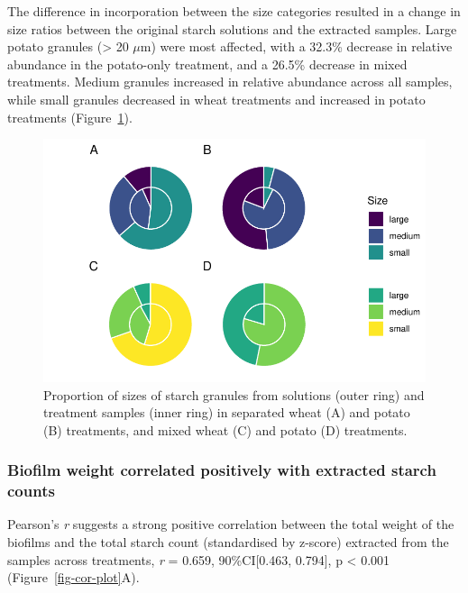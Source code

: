 \documentclass[
  b5paper,
]{book}
\begin{document}
The difference in incorporation between the size categories resulted in
a change in size ratios between the original starch solutions and the
extracted samples. Large potato granules (\textgreater{} 20 \(\mu\)m)
were most affected, with a 32.3\% decrease in relative abundance in the
potato-only treatment, and a 26.5\% decrease in mixed treatments. Medium
granules increased in relative abundance across all samples, while small
granules decreased in wheat treatments and increased in potato
treatments (Figure~\ref{fig-ratio-plots}).

\begin{figure}[H]

{\centering \includegraphics{figures/byoc-starch-fig-ratio-plots-1.pdf}

}

\caption{\label{fig-ratio-plots}Proportion of sizes of starch granules
from solutions (outer ring) and treatment samples (inner ring) in
separated wheat (A) and potato (B) treatments, and mixed wheat (C) and
potato (D) treatments.}

\end{figure}

\hypertarget{biofilm-weight-correlated-positively-with-extracted-starch-counts}{%
\subsubsection{Biofilm weight correlated positively with extracted
starch
counts}\label{biofilm-weight-correlated-positively-with-extracted-starch-counts}}

Pearson's \emph{r} suggests a strong positive correlation between the
total weight of the biofilms and the total starch count (standardised by
z-score) extracted from the samples across treatments, \emph{r} = 0.659,
90\%CI{[}0.463, 0.794{]}, p \textless{} 0.001
(Figure~\ref{fig-cor-plot}A).
\end{document}
